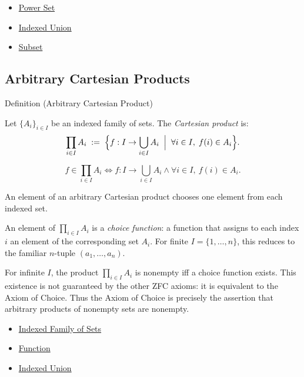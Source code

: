 \begin{dependencies}
\begin{itemize}
  \item \hyperref[def:power-set]{Power Set}
  \item \hyperref[def:indexed-union]{Indexed Union}
  \item \hyperref[def:subset]{Subset}
\end{itemize}
\end{dependencies}

\begin{exposition}
\vspace{1em}
\end{exposition}
\subsection*{Arbitrary Cartesian Products}

\begin{definitionbox}{Definition (Arbitrary Cartesian Product)}
\begin{definition}\label{def:arbitrary-product}
Let $\{A_i\}_{i \in I}$ be an indexed family of sets. The \emph{Cartesian
product} is:
\[
\prod_{i \in I} A_i
\;:=\;
\Bigl\{
f : I \to \bigcup_{i \in I} A_i
\;\Bigm|\;
\forall i \in I,\; f(i) \in A_i
\Bigr\}.
\]
\end{definition}
\end{definitionbox}

\begin{remark*}
\[
  f\in\prod_{i\in I}A_i
  \iff
  f:I\to\bigcup_{i\in I}A_i
  \wedge
  \forall i\in I,\ f(i)\in A_i.
\]
\end{remark*}

\begin{remark*}[Interpretation]
An element of an arbitrary Cartesian product chooses one element from each
indexed set.
\end{remark*}

\begin{remark*}[Exposition]
An element of $\prod_{i \in I} A_i$ is a \emph{choice function}: a function
that assigns to each index $i$ an element of the corresponding set $A_i$.
For finite $I = \{1,\dots,n\}$, this reduces to the familiar $n$-tuple
$(a_1,\dots,a_n)$.
\end{remark*}

\begin{remark*}[Exposition]
For infinite $I$, the product $\prod_{i \in I} A_i$ is nonempty iff a choice
function exists. This existence is not guaranteed by the other ZFC axioms:
it is equivalent to the Axiom of Choice. Thus the Axiom of Choice is
precisely the assertion that arbitrary products of nonempty sets are nonempty.
\end{remark*}

\begin{dependencies}
\begin{itemize}
  \item \hyperref[def:indexed-family]{Indexed Family of Sets}
  \item \hyperref[def:function]{Function}
  \item \hyperref[def:indexed-union]{Indexed Union}
\end{itemize}
\end{dependencies}
